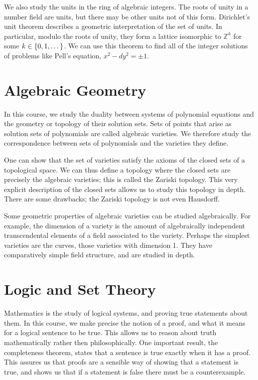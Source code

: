 We also study the units in the ring of algebraic integers.
The roots of unity in a number field are units, but there may be other units not of this form.
Dirichlet's unit theorem describes a geometric interpretation of the set of units.
In particular, modulo the roots of unity, they form a lattice isomorphic to \( \mathbb Z^k \) for some \( k \in \qty{0, 1, \dots} \).
We can use this theorem to find all of the integer solutions of problems like Pell's equation, \( x^2 - d y^2 = \pm 1 \).



\chapter{Algebraic Geometry}
In this course, we study the duality between systems of polynomial equations and the geometry or topology of their solution sets.
Sets of points that arise as solution sets of polynomials are called algebraic varieties.
We therefore study the correspondence between sets of polynomials and the varieties they define.

One can show that the set of varieties satisfy the axioms of the closed sets of a topological space.
We can thus define a topology where the closed sets are precisely the algebraic varieties; this is called the Zariski topology.
This very explicit description of the closed sets allows us to study this topology in depth.
There are some drawbacks; the Zariski topology is not even Hausdorff.

Some geometric properties of algebraic varieties can be studied algebraically.
For example, the dimension of a variety is the amount of algebraically independent transcendental elements of a field associated to the variety.
Perhaps the simplest varieties are the curves, those varieties with dimension 1.
They have comparatively simple field structure, and are studied in depth.



\chapter{Logic and Set Theory}
Mathematics is the study of logical systems, and proving true statements about them.
In this course, we make precise the notion of a proof, and what it means for a logical sentence to be true.
This allows us to reason about truth mathematically rather then philosophically.
One important result, the completeness theorem, states that a sentence is true exactly when it has a proof.
This assures us that proofs are a sensible way of showing that a statement is true, and shows us that if a statement is false there must be a counterexample.

